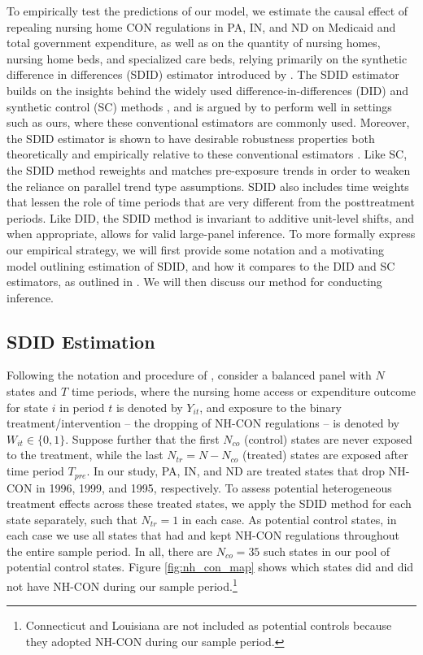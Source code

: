 \documentclass[../Main.tex]{subfiles}
\begin{document}
To empirically test the predictions of our model, we estimate the causal effect of repealing nursing home CON regulations in PA, IN, and ND on Medicaid and total government expenditure, as well as on the quantity of nursing homes, nursing home beds, and specialized care beds, relying primarily on the synthetic difference in differences (SDID) estimator introduced by \citet{arkhangelsky2021synthetic}. The SDID estimator builds on the insights behind the widely used difference-in-differences (DID) and synthetic control (SC) methods \citep{abadie2003economic,abadie2010synthetic,currie2020technology}, and is argued by \citet{arkhangelsky2021synthetic} to perform well in settings such as ours, where these conventional estimators are commonly used. Moreover, the SDID estimator is shown to have desirable robustness properties both theoretically and empirically relative to these conventional estimators \citep{arkhangelsky2021synthetic}. Like SC, the SDID method reweights and matches pre-exposure trends in order to weaken the reliance on parallel trend type assumptions. SDID also includes time weights that lessen the role of time periods that are very different from the posttreatment periods. Like DID, the SDID method is invariant to additive unit-level shifts, and when appropriate, allows for valid large-panel inference. To more formally express our empirical strategy, we will first provide some notation and a motivating model outlining estimation of SDID, and how it compares to the DID and SC estimators, as outlined in \citet{arkhangelsky2021synthetic}. We will then discuss our method for conducting inference.

\subsection{SDID Estimation} \label{sdid_estimation}

Following the notation and procedure of \citet{arkhangelsky2021synthetic}, consider a balanced panel with $N$ states and $T$ time periods, where the nursing home access or expenditure outcome for state $i$ in period $t$ is denoted by $Y_{it}$, and exposure to the binary treatment/intervention -- the dropping of NH-CON regulations -- is denoted by $W_{it} \in \{0,1\}$. Suppose further that the first $N_{co}$ (control) states are never exposed to the treatment, while the last $N_{tr}=N-N_{co}$ (treated) states are exposed after time period $T_{pre}$. In our study, PA, IN, and ND are treated states that drop NH-CON in 1996, 1999, and 1995, respectively. To assess potential heterogeneous treatment effects across these treated states, we apply the SDID method for each state separately, such that $N_{tr}=1$ in each case. As potential control states, in each case we use all states that had and kept NH-CON regulations throughout the entire sample period. In all, there are $N_{co}=35$ such states in our pool of potential control states. Figure \ref{fig:nh_con_map} shows which states did and did not have NH-CON during our sample period.\footnote{Connecticut and Louisiana are not included as potential controls because they adopted NH-CON during our sample period.}
\end{document}
